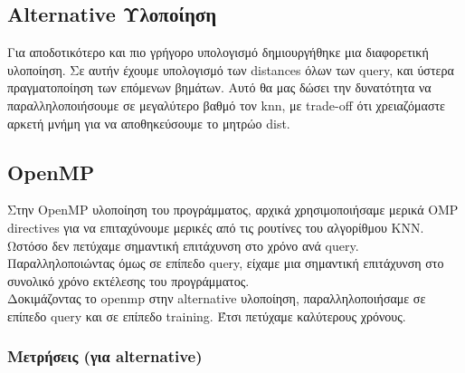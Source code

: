 \documentclass[11pt]{scrartcl} %
\begin{document}
\subsection{Alternative Υλοποίηση}
Για αποδοτικότερο και πιο γρήγορο υπολογισμό δημιουργήθηκε μια διαφορετική υλοποίηση. Σε αυτήν έχουμε υπολογισμό των distances όλων των query,
και ύστερα πραγματοποίηση των επόμενων βημάτων. Αυτό θα μας δώσει την δυνατότητα να παραλληλοποιήσουμε σε μεγαλύτερο βαθμό τον knn, με
trade-off ότι χρειαζόμαστε αρκετή μνήμη για να αποθηκεύσουμε το μητρώο dist.

\subsection{OpenMP}

Στην OpenMP υλοποίηση του προγράμματος, αρχικά χρησιμοποιήσαμε μερικά OMP directives
για να επιταχύνουμε μερικές από τις ρουτίνες του αλγορίθμου ΚΝΝ.
Ωστόσο δεν πετύχαμε σημαντική επιτάχυνση στο χρόνο ανά query.
Παραλληλοποιώντας όμως σε επίπεδο query, είχαμε μια σημαντική επιτάχυνση στο συνολικό χρόνο εκτέλεσης του προγράμματος.
\\

Δοκιμάζοντας το openmp στην alternative υλοποίηση, παραλληλοποιήσαμε σε επίπεδο 
query και σε επίπεδο training. Έτσι πετύχαμε καλύτερους χρόνους.

\subsubsection{Μετρήσεις (για alternative)}
\end{document}
